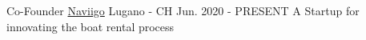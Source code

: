 
\begin{cventries}
  \cventry
    {Co-Founder} %
    {\href{https://www.naviigo.com}{Naviigo}} %
    {Lugano - CH} %
    {Jun. 2020 -  PRESENT} %
    {
      A Startup for innovating the boat rental process
    }
\end{cventries}